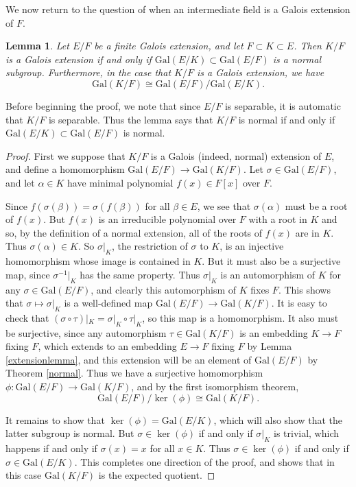 \documentclass[12pt]{report}
\newtheorem{lemma}[theorem]{Lemma}
\theoremstyle{definition}
\newcommand{\Gal}{\text{Gal}}
\begin{document}
We now return to the question of when an intermediate field is a Galois
extension of $F$.

\begin{lemma}
	Let $E/F$ be a finite Galois extension, and let $F \subset  K \subset  E$. Then $K/F$ is a Galois extension if and only if $\Gal(E/K) \subset  \Gal(E/F)$ is a normal subgroup. Furthermore, in the case that $K/F$ is a Galois extension, we have $$\Gal(K/F)\cong \Gal(E/F)/\Gal(E/K).$$
\end{lemma}

Before beginning the proof, we note that since $E/F$ is separable, it is automatic that $K/F$ is separable. Thus the lemma says that $K/F$ is normal if and only if $\Gal(E/K) \subset  \Gal(E/F)$ is normal.

\begin{proof}
	First we suppose that $K/F$ is a Galois (indeed, normal) extension of $E$, and define a homomorphism $\Gal(E/F) \to  \Gal(K/F)$. Let $\sigma\in \Gal(E/F)$, and let $\alpha\in K$ have minimal polynomial $f(x)\in F[x]$ over $F$.

	Since $f(\sigma(\beta)) = \sigma(f(\beta))$ for all $\beta\in E$, we see that $\sigma(\alpha)$ must be a root of $f(x)$. But $f(x)$ is an irreducible polynomial over $F$ with a root in $K$ and so, by the definition of a normal extension, all of the roots of $f(x)$ are in $K$. Thus $\sigma(\alpha)\in K$. So $\sigma|_K$, the restriction of $\sigma$ to $K$, is an injective homomorphism whose image is contained in $K$. But it must also be a surjective map, since $\sigma^{-1}|_K$ has the same property. Thus $\sigma|_K$ is an automorphism of $K$ for any $\sigma\in \Gal(E/F)$, and clearly this automorphism of $K$ fixes $F$. This shows that $\sigma \mapsto \sigma|_K$ is a well-defined map $\Gal(E/F) \to  \Gal(K/F)$. It is easy to check that $(\sigma \circ \tau )|_K = \sigma|_K \circ \tau|_K$, so this map is a homomorphism. It also must be surjective, since any automorphism $\tau\in \Gal(K/F)$ is an embedding $K \to  F$ fixing $F$, which extends to an embedding $E \to  F$ fixing $F$ by Lemma \ref{extensionlemma}, and this extension will be an element of $\Gal(E/F)$ by Theorem \ref{normal}. Thus we have a surjective homomorphism $\phi: \Gal(E/F) \to  \Gal(K/F)$, and by the first isomorphism theorem,
	$$ \Gal(E/F)/\ker(\phi)\cong \Gal(K/F).$$

	It remains to show that $\ker(\phi) = \Gal(E/K)$, which will also show that the latter subgroup is normal. But $\sigma\in \ker(\phi)$ if and only if $\sigma|_K$ is trivial, which happens if and only if $\sigma(x) = x$ for all $x\in K$. Thus $\sigma\in \ker(\phi)$ if and only if $\sigma\in \Gal(E/K)$. This completes one direction of the proof, and shows that in this case $\Gal(K/F)$ is the expected quotient.


\end{proof}
\end{document}
